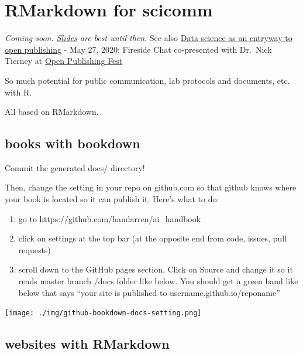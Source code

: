\documentclass[
  letterpaper,
  DIV=11,
  numbers=noendperiod]{scrreprt}
\providecommand{\tightlist}{%
  \setlength{\itemsep}{0pt}\setlength{\parskip}{0pt}}
\begin{document}
\hypertarget{r-scicomm}{%
\chapter{RMarkdown for scicomm}\label{r-scicomm}}

\emph{Coming soon.
\href{https://docs.google.com/presentation/d/1efJj7Dxg_g4ZRZT2b1agDQrT3DN5lVcNvv25IWcyGlw/edit?usp=sharing}{Slides}
are best until then}. See also
\href{https://docs.google.com/presentation/d/1Jv0akRHEnjG_4t_9P7t93682BCBJskYnRu_7EnaeDQI/edit?usp=sharing}{Data
science as an entryway to open publishing} - May 27, 2020: Fireside Chat
co-presented with Dr.~Nick Tierney at
\href{https://openpublishingfest.org/calendar.html\#event-74}{Open
Publishing Fest}

So much potential for public communication, lab protocols and documents,
etc. with R.

All based on RMarkdown.

\hypertarget{books-with-bookdown}{%
\section{books with bookdown}\label{books-with-bookdown}}

Commit the generated docs/ directory!

Then, change the setting in your repo on github.com so that github knows
where your book is located so it can publish it. Here's what to do:

\begin{enumerate}
\def\labelenumi{\arabic{enumi}.}
\tightlist
\item
  go to https://github.com/haudarren/ai\_handbook
\item
  click on settings at the top bar (at the opposite end from code,
  issues, pull requests)
\item
  scroll down to the GitHub pages section. Click on Source and change it
  so it reads master branch /docs folder like below. You should get a
  green band like below that says ``your site is published to
  username.github.io/reponame''
\end{enumerate}

\texttt{[image: ./img/github-bookdown-docs-setting.png]}

\hypertarget{websites-with-rmarkdown}{%
\section{websites with RMarkdown}\label{websites-with-rmarkdown}}
\end{document}
